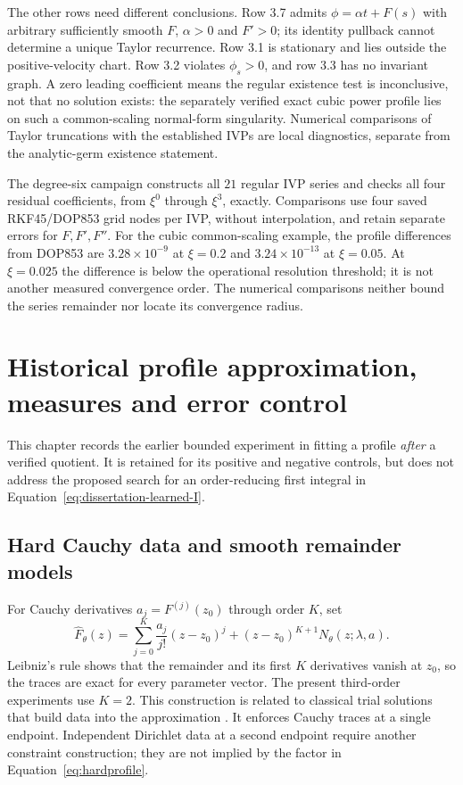 \documentclass[12pt,a4paper,oneside]{report}
\numberwithin{equation}{chapter}
\begin{document}
The other rows need different conclusions. Row 3.7 admits
$\phi=\alpha t+F(s)$ with arbitrary sufficiently smooth $F$, $\alpha>0$
and $F'>0$; its identity pullback cannot determine a unique Taylor
recurrence. Row 3.1 is stationary and lies outside the positive-velocity
chart. Row 3.2 violates $\phi_s>0$, and row 3.3 has no invariant graph.
A zero leading coefficient means the regular existence test is inconclusive,
not that no solution exists: the separately verified exact cubic power
profile lies on such a common-scaling normal-form singularity. Numerical
comparisons of Taylor truncations with the established IVPs are local
diagnostics, separate from the analytic-germ existence statement.

The degree-six campaign constructs all $21$ regular IVP series and checks
all four residual coefficients, from $\xi^0$ through $\xi^3$, exactly.
Comparisons use four saved RKF45/DOP853 grid nodes per IVP, without
interpolation, and retain separate errors for $F,F',F''$. For the cubic
common-scaling example, the profile differences from DOP853 are
$3.28\times10^{-9}$ at $\xi=0.2$ and $3.24\times10^{-13}$ at $\xi=0.05$.
At $\xi=0.025$ the difference is below the operational resolution threshold;
it is not another measured convergence order. The numerical comparisons
neither bound the series remainder nor locate its convergence radius.

\chapter{Historical profile approximation, measures and error control}\label{ch:learning}
This chapter records the earlier bounded experiment in fitting a profile
\emph{after} a verified quotient. It is retained for its positive and negative
controls, but does not address the proposed search for an order-reducing
first integral in Equation~\eqref{eq:dissertation-learned-I}.
\section{Hard Cauchy data and smooth remainder models}
For Cauchy derivatives $a_j=F^{(j)}(z_0)$ through order $K$, set
\begin{equation}\label{eq:hardprofile}
\widehat F_\theta(z)=\sum_{j=0}^K\frac{a_j}{j!}(z-z_0)^j
 +(z-z_0)^{K+1}N_\theta(z;\lambda,a).
\end{equation}
Leibniz's rule shows that the remainder and its first $K$ derivatives vanish
at $z_0$, so the traces are exact for every parameter vector. The present
third-order experiments use $K=2$. This construction is related to classical
trial solutions that build data into the approximation \cite{lagaris}.
It enforces Cauchy traces at a single endpoint. Independent Dirichlet data at
a second endpoint require another constraint construction; they are not
implied by the factor in Equation~\eqref{eq:hardprofile}.
\end{document}
